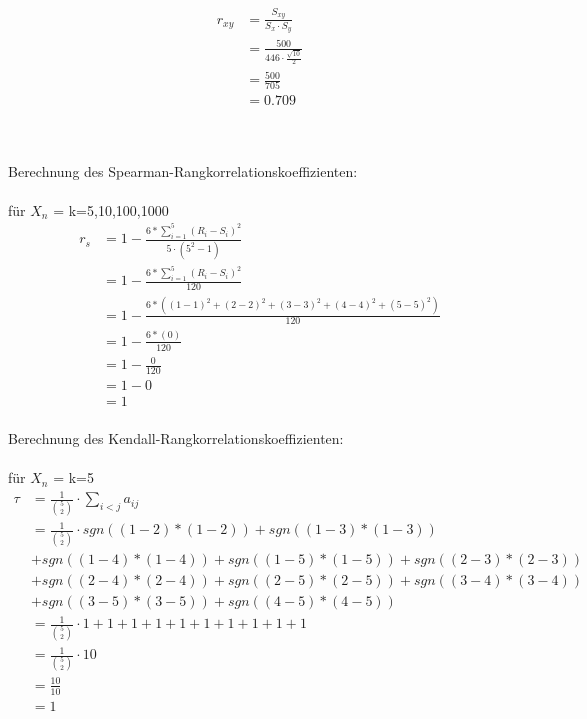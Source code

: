 \documentclass[a4paper,12pt]{article}
\begin{document}
	\begin{align*}
	r_{xy} 
	&= \frac{S_{xy}}{S_{x} \cdot S_{y}}\\
	&= \frac{500}{446 \cdot \frac{\sqrt{10}}{2}}\\
	&= \frac{500}{705} \\
	&= 0.709
	\end{align*}
	\\\\
	
	\newpage
	
	Berechnung des Spearman-Rangkorrelationskoeffizienten:\\\\
	
	für $X_{n}$ = k=5,10,100,1000 \\
	
	\begin{align*}
	r_{s} 
	&= 1 - \frac{6*\sum_{i=1}^{5}(R_{i}-S_{i})^2}{5 \cdot (5^2 - 1)} \\
	&= 1 - \frac{6*\sum_{i=1}^{5}(R_{i}-S_{i})^2}{120} \\
	&= 1 - \frac{6*((1-1)^2 + (2-2)^2 + (3-3)^2 + (4-4)^2 + (5-5)^2)}{120}	\\
	&= 1 - \frac{6*(0)}{120}  \\
	&= 1 - \frac{0}{120}\\
	&= 1 - 0\\
	&= 1\\
	\end{align*}
	
	Berechnung des Kendall-Rangkorrelationskoeffizienten:\\\\
	
	für $X_{n}$ = k=5 \\
	
	\begin{align*}
	\tau 
	&= \frac{1}{\binom{5}{2}} \cdot \sum_{i<j}^{} a_{ij} \\
	&= \frac{1}{\binom{5}{2}} \cdot sgn((1-2)*(1-2)) + sgn((1-3)*(1-3))\\
	& +sgn((1-4)*(1-4)) +sgn((1-5)*(1-5)) +sgn((2-3)*(2-3)) \\
	&+ sgn((2-4)*(2-4)) + sgn((2-5)*(2-5)) + sgn((3-4)*(3-4))\\
	& + sgn((3-5)*(3-5)) + sgn((4-5)*(4-5))  \\
	&= \frac{1}{\binom{5}{2}} \cdot 1 + 1 + 1 + 1 + 1 + 1 + 1 +	1 + 1 + 1 \\
	&= \frac{1}{\binom{5}{2}} \cdot 10  \\
	&= \frac{10}{10} \\
	&= 1 
	\end{align*}
	
\end{document}
